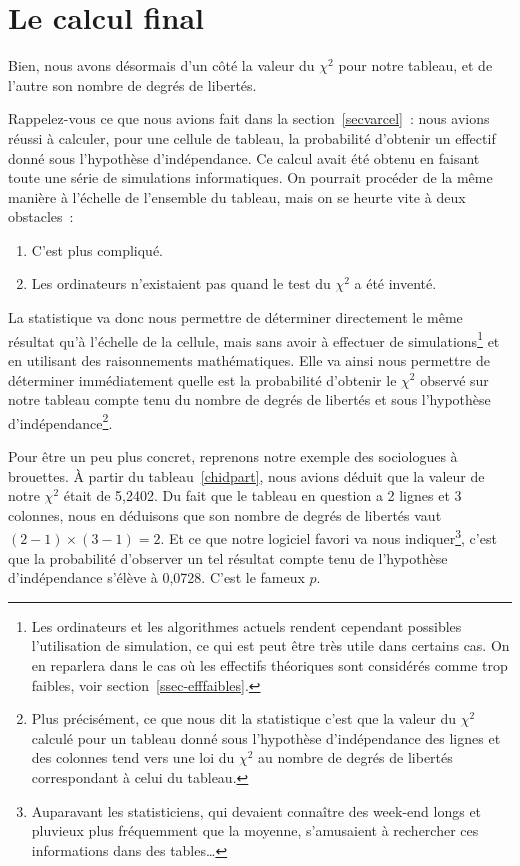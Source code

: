 \documentclass[a4paper,10pt,twoside,francais]{report}
\newcommand{\chid}{$\chi^2$\xspace}
\begin{document}
\section{Le calcul final}
\label{ssec-calcp}

Bien, nous avons désormais d'un côté la valeur du \chid pour notre
tableau, et de l'autre son nombre de degrés de libertés. 

Rappelez-vous ce que nous avions fait dans la
section~\vref{secvarcel}~: nous avions réussi à calculer, pour une
cellule de tableau, la probabilité d'obtenir un effectif donné sous
l'hypothèse d'indépendance. Ce calcul avait été obtenu en faisant
toute une série de simulations informatiques. On pourrait procéder de
la même manière à l'échelle de l'ensemble du tableau, mais on se
heurte vite à deux obstacles~:
\begin{enumerate}
\item C'est plus compliqué.
\item Les ordinateurs n'existaient pas quand le test du \chid a été inventé.
\end{enumerate}

La statistique va donc nous permettre de déterminer directement le
même résultat qu'à l'échelle de la cellule, mais sans avoir à
effectuer de simulations\footnote{Les ordinateurs et les algorithmes
  actuels rendent cependant possibles l'utilisation de simulation, ce
  qui est peut être très utile dans certains cas. On en reparlera dans
  le cas où les effectifs théoriques sont considérés comme trop
  faibles, voir section~\vref{ssec-efffaibles}.} et en utilisant des
raisonnements mathématiques. Elle va ainsi nous permettre de
déterminer immédiatement quelle est la probabilité d'obtenir le \chid
observé sur notre tableau compte tenu du nombre de degrés de libertés
et sous l'hypothèse d'indépendance\footnote{Plus précisément, ce que
  nous dit la statistique c'est que la valeur du \chid calculé pour un
  tableau donné sous l'hypothèse d'indépendance des lignes et des
  colonnes tend vers une loi du \chid au nombre de degrés de libertés
  correspondant à celui du tableau.}.

Pour être un peu plus concret, reprenons notre exemple des sociologues
à brouettes. À partir du tableau~\vref{chidpart}, nous avions déduit
que la valeur de notre \chid était de 5,2402. Du fait que le tableau
en question a 2 lignes et 3 colonnes, nous en déduisons que son nombre
de degrés de libertés vaut $(2-1) \times (3-1) = 2$. Et ce que notre
logiciel favori va nous indiquer\footnote{Auparavant les
  statisticiens, qui devaient connaître des week-end longs et pluvieux
  plus fréquemment que la moyenne, s'amusaient à rechercher ces
  informations dans des tables\ldots}, c'est que la probabilité
d'observer un tel résultat compte tenu de l'hypothèse d'indépendance
s'élève à 0,0728. C'est le fameux $p$.
\end{document}
